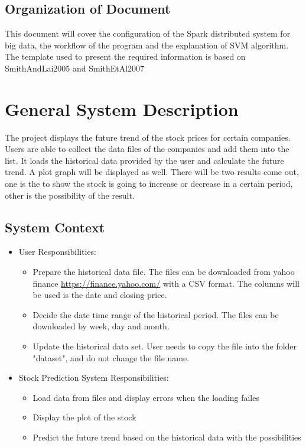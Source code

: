 \documentclass[12pt]{article}
\newcommand{\progname}{Stock Prediction System} %
\begin{document}
\subsection{Organization of Document}
This document will cover the configuration of the Spark distributed system for
big data, the workflow of the program and the explanation of SVM algorithm.
The template used to present the required 
information is based on SmithAndLai2005 and SmithEtAl2007

\section{General System Description}

The project displays the future trend of the stock prices for certain companies. Users are able to collect the data files of the companies and add them into the list. It loads the historical data
provided by the user and calculate the future trend. A plot
graph will be displayed as well. There will be two results come out, one is the
to show the stock is going to increase or decrease in a certain period, other is the possibility of the result. 

\subsection{System Context}

\begin{itemize}
\item User Responsibilities:
\begin{itemize}
\item Prepare the historical data file. The files can be downloaded from yahoo finance \url{https://finance.yahoo.com/} 
with a CSV format. The columns will be used is the date and closing price. 
\item Decide the date time range of the historical period. The files can be downloaded by week, day and month.
\item Update the historical data set. User needs to copy the file into the folder "dataset", and do not change the file name.
\end{itemize}
\item \progname{} Responsibilities:
\begin{itemize}
\item Load data from files and display errors when the loading failes
\item Display the plot of the stock
\item Predict the future trend based on the historical data with the possibilities
\end{itemize}
\end{itemize}
\end{document}
